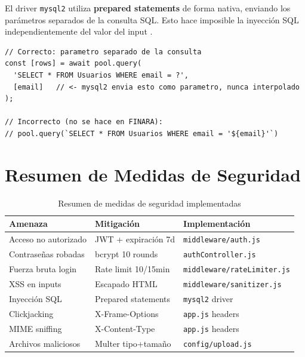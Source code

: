 El driver \texttt{mysql2} utiliza \textbf{prepared statements} de forma nativa, enviando los parámetros separados de la consulta SQL. Esto hace imposible la inyección SQL independientemente del valor del input \cite{owasp_sqli}.

\begin{lstlisting}[style=javascript, caption={Prepared statement con mysql2}]
// Correcto: parametro separado de la consulta
const [rows] = await pool.query(
  'SELECT * FROM Usuarios WHERE email = ?',
  [email]   // <- mysql2 envia esto como parametro, nunca interpolado
);

// Incorrecto (no se hace en FINARA):
// pool.query(`SELECT * FROM Usuarios WHERE email = '${email}'`)
\end{lstlisting}

\section{Resumen de Medidas de Seguridad}

\begin{longtable}{p{4.5cm} p{4cm} p{5cm}}
  \caption{Resumen de medidas de seguridad implementadas}
  \label{tab:seguridad-resumen} \\
  \toprule
  \textbf{Amenaza} & \textbf{Mitigación} & \textbf{Implementación} \\
  \midrule
  Acceso no autorizado & JWT + expiración 7d & \texttt{middleware/auth.js} \\
  Contraseñas robadas  & bcrypt 10 rounds    & \texttt{authController.js} \\
  Fuerza bruta login   & Rate limit 10/15min & \texttt{middleware/rateLimiter.js} \\
  XSS en inputs        & Escapado HTML       & \texttt{middleware/sanitizer.js} \\
  Inyección SQL        & Prepared statements & \texttt{mysql2} driver \\
  Clickjacking         & X-Frame-Options     & \texttt{app.js} headers \\
  MIME sniffing        & X-Content-Type      & \texttt{app.js} headers \\
  Archivos maliciosos  & Multer tipo+tamaño  & \texttt{config/upload.js} \\
  \bottomrule
\end{longtable}
